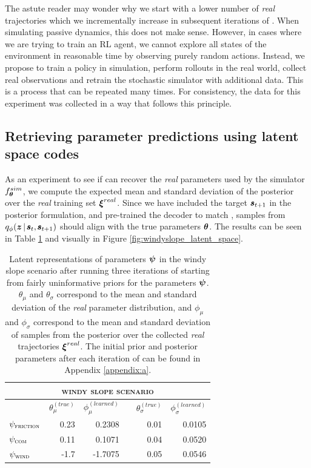 The astute reader may wonder why we start with a lower number of \emph{real} trajectories which we incrementally increase in subsequent iterations of \dettostoc{}. When simulating passive dynamics, this does not make sense. However, in cases where we are trying to train an RL agent, we cannot explore all states of the environment in reasonable time by observing purely random actions. Instead, we propose to train a policy in simulation, perform rollouts in the real world, collect real observations and retrain the stochastic simulator with additional data. This is a process that can be repeated many times. For consistency, the data for this experiment was collected in a way that follows this principle.

\subsection{Retrieving parameter predictions using latent space codes}

As an experiment to see if \dettostoc{} can recover the \emph{real} parameters used by the simulator $f^{sim}_{\boldsymbol{\theta}}$, we compute the expected mean and standard deviation of the posterior over the \emph{real} training set $\boldsymbol{\xi}^{real}$. Since we have included the target $\pmb{s}_{t+1}$ in the posterior formulation, and pre-trained the decoder to match \fsimulator{}, samples from $\qphi \given{\vz}{\vs, \vns}$ should align with the true parameters $\boldsymbol{\theta}$. The results can be seen in Table \ref{fig:windyslope_parameters_table} and visually in Figure \ref{fig:windyslope_latent_space}.

\begin{table}[h!]
\centering
\begin{tabular}{lrrcrr}
\multicolumn{6}{c}{\textsc{windy slope scenario}} \\
\toprule
& $\theta_\mu^{(true)}$ & $\phi_\mu^{(learned)}$ && $\theta_\sigma^{(true)}$ & $\phi_\sigma^{(learned)}$ \\
\midrule

$\psi_{\textsc{friction}}$ & 0.23 & 0.2308 && 0.01 & 0.0105 \\
$\psi_{\textsc{com}}$ & 0.11 & 0.1071 && 0.04 & 0.0520 \\
$\psi_{\textsc{wind}}$ & -1.7 & -1.7075 && 0.05 & 0.0546 \\
\bottomrule
\end{tabular}
\caption{Latent representations of parameters $\boldsymbol{\psi}$ in the windy slope scenario after running three iterations of \dettostoc{} starting from fairly uninformative priors for the parameters $\boldsymbol{\psi}$. $\theta_\mu$ and $\theta_\sigma$ correspond to the mean and standard deviation of the \emph{real} parameter distribution, and $\phi_\mu$ and $\phi_\sigma$ correspond to the mean and standard deviation of samples from the posterior over the collected \emph{real} trajectories $\boldsymbol{\xi}^{real}$. The initial prior and posterior parameters after each iteration of \dettostoc{} can be found in Appendix \ref{appendix:a}.}
\label{fig:windyslope_parameters_table}
\end{table}

